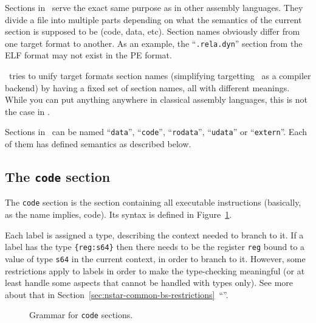 Sections in \nstar\ serve the exact same purpose as in other assembly languages. They divide a file into multiple parts depending on what the semantics of the current section is supposed to be (code, data, etc).
Section names obviously differ from one target format to another. As an example, the ``\texttt{.rela.dyn}'' section from the ELF format may not exist in the PE format.

\nstar\ tries to unify target formats section names (simplifying targetting \nstar\ as a compiler backend) by having a fixed set of section names, all with different meanings. While you can put anything anywhere in classical assembly languages, this is not the case in \nstar.

Sections in \nstar\ can be named ``\texttt{data}'', ``\texttt{code}'', ``\texttt{rodata}'', ``\texttt{udata}'' or ``\texttt{extern}''. Each of them has defined semantics as described below.

\subsection{The \texttt{code} section}\label{subsec:nstar-common-sections-code}

The \texttt{code} section is the section containing all executable instructions (basically, as the name implies, code).
Its syntax is defined in Figure~\ref{fig:nstar-common-sections-code-grammar}.

Each label is assigned a type, describing the context needed to branch to it.
If a label has the type \texttt{\{reg:s64\}} then there needs to be the register \texttt{reg} bound to a value of type \texttt{s64} in the current context, in order to branch to it.
However, some restrictions apply to labels in order to make the type-checking meaningful (or at least handle some aspects that cannot be handled with types only). See more about that in Section~\ref{sec:nstar-common-bs-restrictions}~``''.

\begin{figure}[htb]
  \centering


  \caption{Grammar for \texttt{code} sections.}
  \label{fig:nstar-common-sections-code-grammar}
\end{figure}

